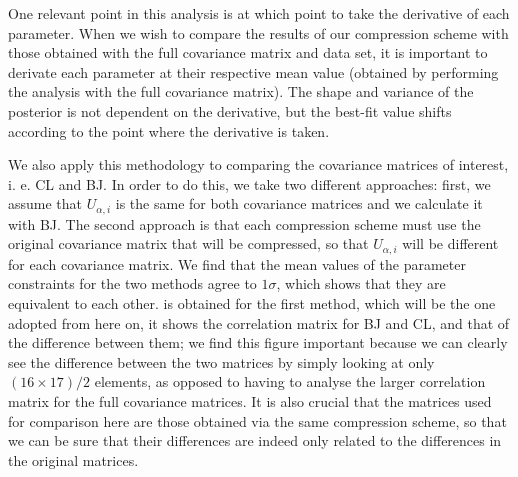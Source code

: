 \documentclass[twocolumn]{\docclass}
\begin{document}
	One relevant point in this analysis is at which point to take the derivative of each parameter. When we wish to compare the results of our compression scheme with those obtained with the full covariance matrix and data set, it is important to derivate each parameter at their respective mean value (obtained by performing the analysis with the full covariance matrix). The shape and variance of the posterior is not dependent on the derivative, but the best-fit value shifts according to the point where the derivative is taken.
	
	We also apply this methodology to comparing the covariance matrices of interest, i. e. CL and BJ. In order to do this, we take two different approaches: first, we assume that $U_{\alpha, i}$ is the same for both covariance matrices and we calculate it with BJ. The second approach is that each compression scheme must use the original covariance matrix that will be compressed, so that $U_{\alpha, i}$ will be different for each covariance matrix. We find that the mean values of the parameter constraints for the two methods agree to $1 \sigma$, which shows that they are equivalent to each other.  is obtained for the first method, which will be the one adopted from here on, it shows the correlation matrix for BJ and CL, and that of the difference between them; we find this figure important because we can clearly see the difference between the two matrices by simply looking at only $(16 \times 17)/2$ elements, as opposed to having to analyse the larger correlation matrix for the full covariance matrices. It is also crucial that the matrices used for comparison here are those obtained via the same compression scheme, so that we can be sure that their differences are indeed only related to the differences in the original matrices.
	
\end{document}
